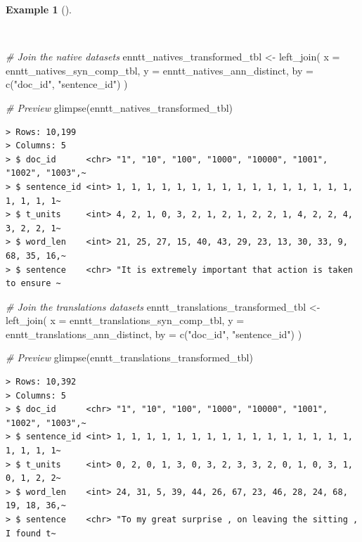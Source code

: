 \documentclass[
  letterpaper,
]{latex/krantz}
\newenvironment{Shaded}{\begin{snugshade}}{\end{snugshade}}
\newcommand{\AttributeTok}[1]{\textcolor[rgb]{0.00,0.00,0.00}{#1}}
\newcommand{\CommentTok}[1]{\textcolor[rgb]{0.00,0.00,0.00}{\textit{#1}}}
\newcommand{\FunctionTok}[1]{\textcolor[rgb]{0.00,0.00,0.00}{#1}}
\newcommand{\NormalTok}[1]{\textcolor[rgb]{0.00,0.00,0.00}{#1}}
\newcommand{\OtherTok}[1]{\textcolor[rgb]{0.00,0.00,0.00}{#1}}
\newcommand{\StringTok}[1]{\textcolor[rgb]{0.00,0.00,0.00}{#1}}
\theoremstyle{definition}
\newtheorem{example}{Example}[chapter]
\theoremstyle{remark}
\begin{document}
\begin{example}[]\protect\hypertarget{exm-td-merging-join-left-syn-comp}{}\label{exm-td-merging-join-left-syn-comp}

~

\begin{Shaded}
\begin{Highlighting}[]
\CommentTok{\# Join the native datasets}
\NormalTok{enntt\_natives\_transformed\_tbl }\OtherTok{\textless{}{-}}
  \FunctionTok{left\_join}\NormalTok{(}
    \AttributeTok{x =}\NormalTok{ enntt\_natives\_syn\_comp\_tbl,}
    \AttributeTok{y =}\NormalTok{ enntt\_natives\_ann\_distinct,}
    \AttributeTok{by =} \FunctionTok{c}\NormalTok{(}\StringTok{"doc\_id"}\NormalTok{, }\StringTok{"sentence\_id"}\NormalTok{)}
\NormalTok{  )}

\CommentTok{\# Preview}
\FunctionTok{glimpse}\NormalTok{(enntt\_natives\_transformed\_tbl)}
\end{Highlighting}
\end{Shaded}

\begin{verbatim}
> Rows: 10,199
> Columns: 5
> $ doc_id      <chr> "1", "10", "100", "1000", "10000", "1001", "1002", "1003",~
> $ sentence_id <int> 1, 1, 1, 1, 1, 1, 1, 1, 1, 1, 1, 1, 1, 1, 1, 1, 1, 1, 1, 1~
> $ t_units     <int> 4, 2, 1, 0, 3, 2, 1, 2, 1, 2, 2, 1, 4, 2, 2, 4, 3, 2, 2, 1~
> $ word_len    <int> 21, 25, 27, 15, 40, 43, 29, 23, 13, 30, 33, 9, 68, 35, 16,~
> $ sentence    <chr> "It is extremely important that action is taken to ensure ~
\end{verbatim}

\begin{Shaded}
\begin{Highlighting}[]
\CommentTok{\# Join the translations datasets}
\NormalTok{enntt\_translations\_transformed\_tbl }\OtherTok{\textless{}{-}}
  \FunctionTok{left\_join}\NormalTok{(}
    \AttributeTok{x =}\NormalTok{ enntt\_translations\_syn\_comp\_tbl,}
    \AttributeTok{y =}\NormalTok{ enntt\_translations\_ann\_distinct,}
    \AttributeTok{by =} \FunctionTok{c}\NormalTok{(}\StringTok{"doc\_id"}\NormalTok{, }\StringTok{"sentence\_id"}\NormalTok{)}
\NormalTok{  )}

\CommentTok{\# Preview}
\FunctionTok{glimpse}\NormalTok{(enntt\_translations\_transformed\_tbl)}
\end{Highlighting}
\end{Shaded}

\begin{verbatim}
> Rows: 10,392
> Columns: 5
> $ doc_id      <chr> "1", "10", "100", "1000", "10000", "1001", "1002", "1003",~
> $ sentence_id <int> 1, 1, 1, 1, 1, 1, 1, 1, 1, 1, 1, 1, 1, 1, 1, 1, 1, 1, 1, 1~
> $ t_units     <int> 0, 2, 0, 1, 3, 0, 3, 2, 3, 3, 2, 0, 1, 0, 3, 1, 0, 1, 2, 2~
> $ word_len    <int> 24, 31, 5, 39, 44, 26, 67, 23, 46, 28, 24, 68, 19, 18, 36,~
> $ sentence    <chr> "To my great surprise , on leaving the sitting , I found t~
\end{verbatim}

\end{example}
\end{document}
